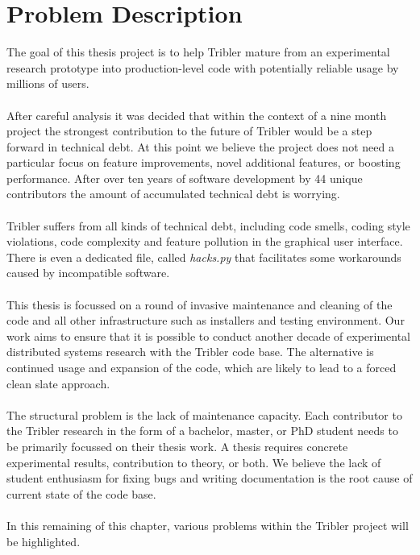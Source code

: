 \label{chapter:problem-description}
\chapter{Problem Description}

The goal of this thesis project is to help Tribler mature from an experimental research prototype into production-level code with potentially reliable usage by millions of users.\\\\
After careful analysis it was decided that within the context of a nine month project the strongest contribution to the future of Tribler would be a step forward in technical debt. At this point we believe the project does not need a particular focus on feature improvements, novel additional features, or boosting performance. After over ten years of software development by 44 unique contributors the amount of accumulated technical debt is worrying.\\\\
Tribler suffers from all kinds of technical debt, including code smells, coding style violations, code complexity and feature pollution in the graphical user interface. There is even a dedicated file, called \emph{hacks.py} that facilitates some workarounds caused by incompatible software.\\\\
This thesis is focussed on a round of invasive maintenance and cleaning of the code and all other infrastructure such as installers and testing environment. Our work aims to ensure that it is possible to conduct another decade of experimental distributed systems research with the Tribler code base. The alternative is continued usage and expansion of the code, which are likely to lead to a forced clean slate approach.\\\\
The structural problem is the lack of maintenance capacity. Each contributor to the Tribler research in the form of a bachelor, master, or PhD student needs to be primarily focussed on their thesis work. A thesis requires concrete experimental results, contribution to theory, or both. We believe the lack of student enthusiasm for fixing bugs and writing documentation is the root cause of current state of the code base.\\\\
In this remaining of this chapter, various problems within the Tribler project will be highlighted.

